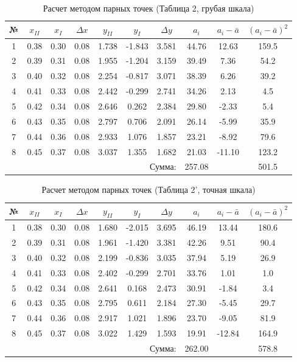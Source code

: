 \begin{table}[ht!]
\centering
\caption{Расчет методом парных точек (Таблица 2, грубая шкала)}
\label{tab:paired1}
\footnotesize
\begin{tabular}{|c|c|c|c|c|c|c|c|c|c|}
\hline
№ & $x_{II}$ & $x_I$ & $\Delta x$ & $y_{II}$ & $y_I$ & $\Delta y$ & $a_i$ & $a_i - \bar{a}$ & $(a_i - \bar{a})^2$ \\ \hline
1 & 0.38 & 0.30 & 0.08 & 1.738 & -1.843 & 3.581 & 44.76 & 12.63 & 159.5 \\ \hline
2 & 0.39 & 0.31 & 0.08 & 1.955 & -1.204 & 3.159 & 39.49 & 7.36 & 54.2 \\ \hline
3 & 0.40 & 0.32 & 0.08 & 2.254 & -0.817 & 3.071 & 38.39 & 6.26 & 39.2 \\ \hline
4 & 0.41 & 0.33 & 0.08 & 2.442 & -0.299 & 2.741 & 34.26 & 2.13 & 4.5 \\ \hline
5 & 0.42 & 0.34 & 0.08 & 2.646 & 0.262 & 2.384 & 29.80 & -2.33 & 5.4 \\ \hline
6 & 0.43 & 0.35 & 0.08 & 2.797 & 0.706 & 2.091 & 26.14 & -5.99 & 35.9 \\ \hline
7 & 0.44 & 0.36 & 0.08 & 2.933 & 1.076 & 1.857 & 23.21 & -8.92 & 79.6 \\ \hline
8 & 0.45 & 0.37 & 0.08 & 3.037 & 1.355 & 1.682 & 21.03 & -11.10 & 123.2 \\ \hline
\multicolumn{7}{|r|}{Сумма:} & 257.08 & & 501.5 \\ \hline
\end{tabular}
\end{table}

\begin{table}[ht!]
\centering
\caption{Расчет методом парных точек (Таблица 2', точная шкала)}
\label{tab:paired2}
\footnotesize
\begin{tabular}{|c|c|c|c|c|c|c|c|c|c|}
\hline
№ & $x_{II}$ & $x_I$ & $\Delta x$ & $y_{II}$ & $y_I$ & $\Delta y$ & $a_i$ & $a_i - \bar{a}$ & $(a_i - \bar{a})^2$ \\ \hline
1 & 0.38 & 0.30 & 0.08 & 1.680 & -2.015 & 3.695 & 46.19 & 13.44 & 180.6 \\ \hline
2 & 0.39 & 0.31 & 0.08 & 1.961 & -1.420 & 3.381 & 42.26 & 9.51 & 90.4 \\ \hline
3 & 0.40 & 0.32 & 0.08 & 2.199 & -0.836 & 3.035 & 37.94 & 5.19 & 26.9 \\ \hline
4 & 0.41 & 0.33 & 0.08 & 2.402 & -0.299 & 2.701 & 33.76 & 1.01 & 1.0 \\ \hline
5 & 0.42 & 0.34 & 0.08 & 2.641 & 0.168 & 2.473 & 30.91 & -1.84 & 3.4 \\ \hline
6 & 0.43 & 0.35 & 0.08 & 2.795 & 0.611 & 2.184 & 27.30 & -5.45 & 29.7 \\ \hline
7 & 0.44 & 0.36 & 0.08 & 2.917 & 1.021 & 1.896 & 23.70 & -9.05 & 81.9 \\ \hline
8 & 0.45 & 0.37 & 0.08 & 3.022 & 1.429 & 1.593 & 19.91 & -12.84 & 164.9 \\ \hline
\multicolumn{7}{|r|}{Сумма:} & 262.00 & & 578.8 \\ \hline
\end{tabular}
\end{table}

